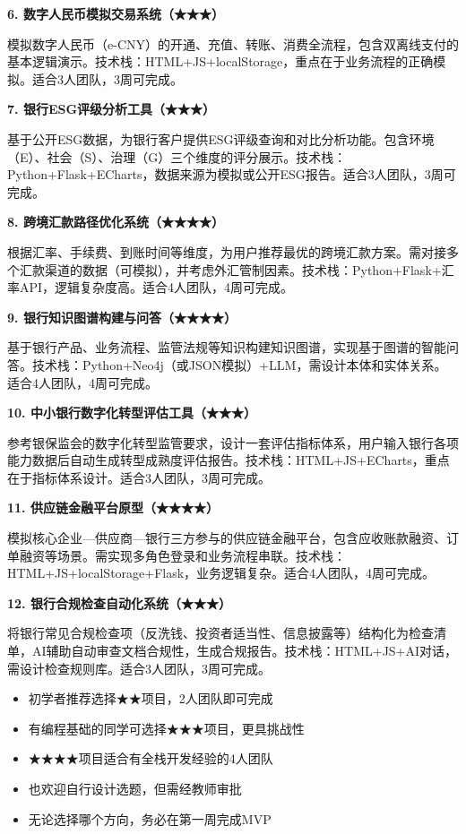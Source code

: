 \textbf{6. 数字人民币模拟交易系统（★★★）}

模拟数字人民币（e-CNY）的开通、充值、转账、消费全流程，包含双离线支付的基本逻辑演示。技术栈：HTML+JS+localStorage，重点在于业务流程的正确模拟。适合3人团队，3周可完成。

\textbf{7. 银行ESG评级分析工具（★★★）}

基于公开ESG数据，为银行客户提供ESG评级查询和对比分析功能。包含环境（E）、社会（S）、治理（G）三个维度的评分展示。技术栈：Python+Flask+ECharts，数据来源为模拟或公开ESG报告。适合3人团队，3周可完成。

\textbf{8. 跨境汇款路径优化系统（★★★★）}

根据汇率、手续费、到账时间等维度，为用户推荐最优的跨境汇款方案。需对接多个汇款渠道的数据（可模拟），并考虑外汇管制因素。技术栈：Python+Flask+汇率API，逻辑复杂度高。适合4人团队，4周可完成。

\textbf{9. 银行知识图谱构建与问答（★★★★）}

基于银行产品、业务流程、监管法规等知识构建知识图谱，实现基于图谱的智能问答。技术栈：Python+Neo4j（或JSON模拟）+LLM，需设计本体和实体关系。适合4人团队，4周可完成。

\textbf{10. 中小银行数字化转型评估工具（★★★）}

参考银保监会的数字化转型监管要求，设计一套评估指标体系，用户输入银行各项能力数据后自动生成转型成熟度评估报告。技术栈：HTML+JS+ECharts，重点在于指标体系设计。适合3人团队，3周可完成。

\textbf{11. 供应链金融平台原型（★★★★）}

模拟核心企业—供应商—银行三方参与的供应链金融平台，包含应收账款融资、订单融资等场景。需实现多角色登录和业务流程串联。技术栈：HTML+JS+localStorage+Flask，业务逻辑复杂。适合4人团队，4周可完成。

\textbf{12. 银行合规检查自动化系统（★★★）}

将银行常见合规检查项（反洗钱、投资者适当性、信息披露等）结构化为检查清单，AI辅助自动审查文档合规性，生成合规报告。技术栈：HTML+JS+AI对话，需设计检查规则库。适合3人团队，3周可完成。

\begin{notebox}[选题建议]
\begin{itemize}[leftmargin=1em]
  \item 初学者推荐选择★★项目，2人团队即可完成
  \item 有编程基础的同学可选择★★★项目，更具挑战性
  \item ★★★★项目适合有全栈开发经验的4人团队
  \item 也欢迎自行设计选题，但需经教师审批
  \item 无论选择哪个方向，务必在第一周完成MVP
\end{itemize}
\end{notebox}

